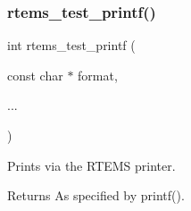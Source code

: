 \subsubsection{\texorpdfstring{rtems\_test\_printf()}{rtems\_test\_printf()}}
{\footnotesize\ttfamily int rtems\+\_\+test\+\_\+printf (\begin{DoxyParamCaption}\item[{const char $\ast$}]{format,  }\item[{}]{... }\end{DoxyParamCaption})}



Prints via the R\+T\+E\+MS printer. 

\begin{DoxyReturn}{Returns}
As specified by printf(). 
\end{DoxyReturn}
